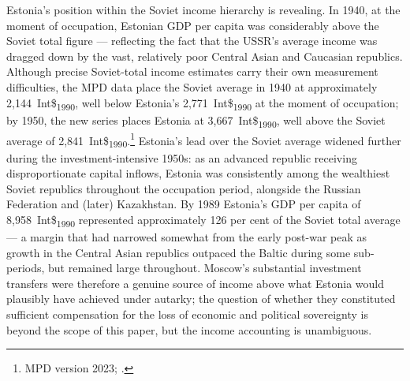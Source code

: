 \documentclass[12pt,a4paper]{article}
\newcommand{\intlnineteen}{Int\$\textsubscript{1990}}   %
\begin{document}
Estonia's position within the Soviet income hierarchy is revealing. In 1940, at the moment of occupation, Estonian GDP per capita was considerably above the Soviet total figure — reflecting the fact that the USSR's average income was dragged down by the vast, relatively poor Central Asian and Caucasian republics. Although precise Soviet-total income estimates carry their own measurement difficulties, the MPD data place the Soviet average in 1940 at approximately 2,144~\intlnineteen{}, well below Estonia's 2,771~\intlnineteen{} at the moment of occupation; by 1950, the new series places Estonia at 3,667~\intlnineteen{}, well above the Soviet average of 2,841~\intlnineteen{}.\footnote{MPD version 2023; \autocite{mpd2023}.} Estonia's lead over the Soviet average widened further during the investment-intensive 1950s: as an advanced republic receiving disproportionate capital inflows, Estonia was consistently among the wealthiest Soviet republics throughout the occupation period, alongside the Russian Federation and (later) Kazakhstan. By 1989 Estonia's GDP per capita of 8,958~\intlnineteen{} represented approximately 126 per cent of the Soviet total average — a margin that had narrowed somewhat from the early post-war peak as growth in the Central Asian republics outpaced the Baltic during some sub-periods, but remained large throughout. Moscow's substantial investment transfers were therefore a genuine source of income above what Estonia would plausibly have achieved under autarky; the question of whether they constituted sufficient compensation for the loss of economic and political sovereignty is beyond the scope of this paper, but the income accounting is unambiguous.
\end{document}
